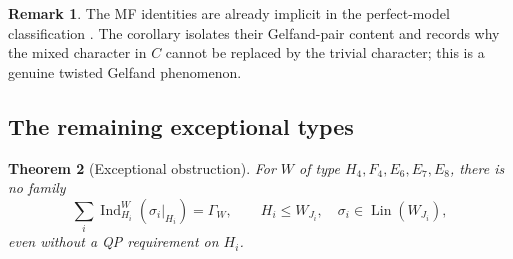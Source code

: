 \documentclass[11pt]{article}
\numberwithin{equation}{section}
\newtheorem{theorem}{Theorem}[section]
\theoremstyle{definition}
\newtheorem{remark}[theorem]{Remark}
\DeclareMathOperator{\Ind}{Ind}
\DeclareMathOperator{\Lin}{Lin}
\begin{document}
\begin{remark}
The MF identities are already implicit in the perfect-model
classification \cite{MZperfect}.  The corollary isolates their
Gelfand-pair content and records why the mixed character in \(C\)
cannot be replaced by the trivial character; this is a genuine twisted
Gelfand phenomenon.
\end{remark}

\subsection{The remaining exceptional types}

\begin{theorem}[Exceptional obstruction]\label{thm:exceptional}
For \(W\) of type \(H_4,F_4,E_6,E_7,E_8\), there is no family
\[
 \sum_i\Ind_{H_i}^W(\sigma_i|_{H_i})=\Gamma_W,
 \qquad H_i\leq W_{J_i},\quad \sigma_i\in\Lin(W_{J_i}),
\]
even without a QP requirement on \(H_i\).
\end{theorem}
\end{document}
